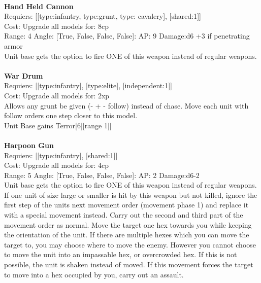\ \\
{\bf Hand Held Cannon } \\

Requiers: [[type:infantry, type:grunt, type: cavalery], [shared:1]] \\
Cost: Upgrade all models for: 8cp \\


Range: 4  Angle: [True, False, False, False]: AP: 9 Damage:d6 +3 if penetrating armor \\
Unit base gets the option to fire ONE of this weapon instead of regular weapons.\\ 








\ \\
{\bf War Drum } \\

Requiers: [[type:infantry], [type:elite], [independent:1]] \\
Cost: Upgrade all models for: 2xp \\
Allows any grunt be given (- + - follow) instead of chase. Move each unit with follow orders one step closer to this model.\\ 
Unit Base gains Terror[6][range 1]]\\ 









\ \\
{\bf Harpoon Gun } \\

Requiers: [[type:infantry], [shared:1]] \\
Cost: Upgrade all models for: 4cp \\


Range: 5  Angle: [True, False, False, False]: AP: 2 Damage:d6-2 \\
Unit base gets the option to fire ONE of this weapon instead of regular weapons.\\ 
If one unit of size large or smaller is hit by this weapon but not killed, ignore the first step of the units next movement order (movement phase 1) and replace it with a special movement instead. Carry out the second and third part of the movement order as normal. Move the target one hex towards you while keeping the orientation of the unit. If there are multiple hexes which you can move the target to, you may choose where to move the enemy. However you cannot choose to move the unit into an impassable hex, or overcrowded hex. If this is not possible, the unit is shaken instead of moved. If this movement forces the target to move into a hex occupied by you, carry out an assault.\\ 








